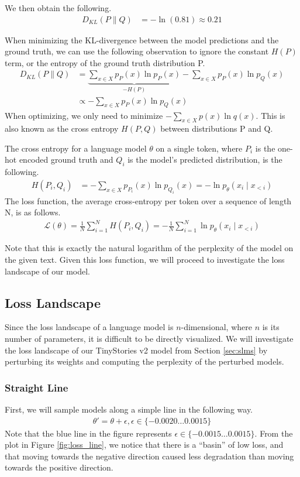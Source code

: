 \documentclass[../main.tex]{subfiles}
\begin{document}
We then obtain the following.
\begin{align}
D_{KL}(P \parallel Q) &= -\ln(0.81) \approx 0.21
\end{align}

When minimizing the KL-divergence between the model predictions and the ground truth, we can use the following observation to ignore the constant $H(P)$ term, or the entropy of the ground truth distribution P.
\begin{align}
    D_{KL}(P\parallel Q)&= \underbrace{\sum_{x\in X} p_P(x)\ln p_P(x)}_{-H(P)} - \sum_{x\in X} p_P(x)\ln p_Q(x)\\
    &\propto -\sum_{x\in X} p_P(x)\ln p_Q(x)
\end{align}
When optimizing, we only need to minimize $-\sum_{x\in X} p(x)\ln q(x)$. This is also known as the cross entropy $H(P, Q)$ between distributions P and Q.

The cross entropy for a language model $\theta$ on a single token, where $P_i$ is the one-hot encoded ground truth and $Q_i$ is the model's predicted distribution, is the following.
\begin{align}
    H(P_i,Q_i) &= -\sum_{x \in X} p_{P_i}(x)\ln p_{Q_i}(x) = - \ln p_\theta (x_i \mid x_{<i})
\end{align}
The loss function, the average cross-entropy per token over a sequence of length N, is as follows.
\begin{align}
    \mathcal{L}(\theta) = \frac1N \sum_{i=1}^N H(P_i, Q_i) = -\frac1N \sum_{i=1}^N \ln p_\theta (x_i \mid x_{<i})
\end{align}

Note that this is exactly the natural logarithm of the perplexity of the model on the given text. Given this loss function, we will proceed to investigate the loss landscape of our model.

\subsection{Loss Landscape}
Since the loss landscape of a language model is $n$-dimensional, where $n$ is its number of parameters, it is difficult to be directly visualized. We will investigate the loss landscape of our TinyStories v2 model from Section \ref{sec:slms} by perturbing its weights and computing the perplexity of the perturbed models.

\subsubsection{Straight Line}
First, we will sample models along a simple line in the following way.
\begin{align}
    \theta' = \theta + \epsilon,  \epsilon \in \{-0.0020 \dots 0.0015\} 
\end{align}
Note that the blue line in the figure represents $\epsilon \in \{-0.0015 \dots 0.0015\}$. From the plot in Figure \ref{fig:loss_line}, we notice that there is a ``basin'' of low loss, and that moving towards the negative direction caused less degradation than moving towards the positive direction.
\end{document}
